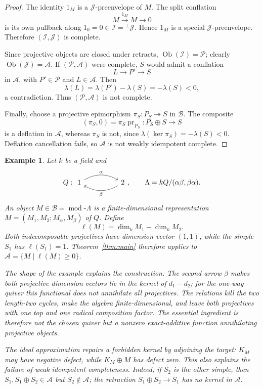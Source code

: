 \documentclass[10pt]{article}
\newtheorem{example}[theorem]{Example}
\theoremstyle{remark}\newtheorem{remark}[theorem]{Remark}
\newcommand{\Ob}{\operatorname{Ob}}
\begin{document}
\begin{proof}
The identity \(1_M\) is a \(\mathcal J\)-preenvelope of \(M\). The split
conflation
\[
 M\xrightarrow{1_M}M\longrightarrow0
\]
is its own pullback along
\(1_0=0\in\mathcal I={}^{\perp}\mathcal J\). Hence \(1_M\) is a
special \(\mathcal J\)-preenvelope. Therefore
\((\mathcal I,\mathcal J)\) is complete.

Since projective objects are closed under retracts,
\(\Ob(\mathcal I)=\mathcal P\); clearly
\(\Ob(\mathcal J)=\mathcal A\). If \((\mathcal P,\mathcal A)\) were
complete, \(S\) would admit a conflation
\[
 L\longrightarrow P'\longrightarrow S
\]
in \(\mathcal A\), with \(P'\in\mathcal P\) and \(L\in\mathcal A\).
Then
\[
 \lambda(L)=\lambda(P')-\lambda(S)=-\lambda(S)<0,
\]
a contradiction.  
Thus \((\mathcal P,\mathcal A)\) is not complete.

Finally, choose a projective epimorphism
\(\pi_S:P_S\twoheadrightarrow S\) in \(\mathcal B\). The composite
\[
 (\pi_S,0)=\pi_S\operatorname{pr}_{P_S}:
 P_S\oplus S\longrightarrow S
\]
is a deflation in \(\mathcal A\), whereas \(\pi_S\) is not, since
\(\lambda(\ker\pi_S)=-\lambda(S)<0\).
Deflation cancellation fails, so \(\mathcal A\) is not weakly idempotent complete.
\end{proof}

 

\begin{example}
    Let \(k\) be a field and
\[
 Q:\begin{tikzcd}
1 \arrow[rr, "\alpha", bend left] &  & 2 \arrow[ll, "\beta", bend left]
\end{tikzcd},
 \qquad \Lambda=kQ/(\alpha\beta,\beta\alpha).
\]
An object \(M\in\mathcal B=\operatorname{mod}\text{-}\Lambda\) is a finite-dimensional representation \(M=(M_1,M_2;M_\alpha,M_\beta)\) of
\(Q\).  
Define
\[
\ell(M)=\dim_k M_1-\dim_k M_2.
\]
Both indecomposable projectives have dimension vector \((1,1)\), while the simple \(S_1\) has \(\ell(S_1)=1\).  
Theorem~\ref{thm:main} therefore applies to \(\mathcal A=\{M\mid\ell(M)\ge0\}\).

The shape of the example explains the construction.  
The second arrow \(\beta\) makes both projective dimension vectors lie in the kernel of \(d_1-d_2\); for the one-way quiver this functional does not annihilate
all projectives.  
The relations kill the two length-two cycles, make the algebra finite-dimensional, and leave both projectives with one top and one radical composition factor.  
The essential ingredient is therefore not the chosen quiver but a nonzero exact-additive function annihilating projective objects.

The ideal approximation repairs a forbidden kernel by adjoining the target: \(K_M\) may have negative defect, while \(K_M\oplus M\) has defect
zero.  
This also explains the failure of weak idempotent completeness.
Indeed, if \(S_2\) is the other simple, then \(S_1,S_1\oplus S_2\in\mathcal A\) but \(S_2\notin\mathcal A\); the retraction \(S_1\oplus S_2\to S_1\) has no kernel in \(\mathcal A\).
\end{example}
\end{document}
